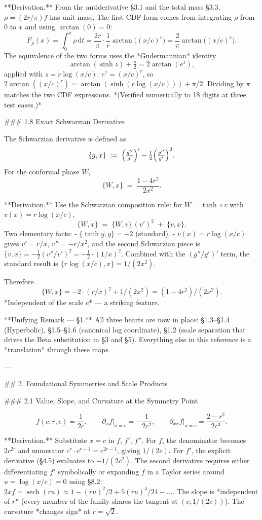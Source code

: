 **Derivation.** From the antiderivative §3.1 and the total mass §3.3, $\rho = (2r/\pi)f$ has unit mass. The first CDF form comes from integrating $\rho$ from 0 to $x$ and using $\arctan(0)=0$:
$$
F_{\rho}(x) = \int_{0}^{x}\rho\,\mathrm dt = \frac{2r}{\pi}\cdot\frac{1}{r}\arctan\!\bigl((x/c)^{r}\bigr) = \frac{2}{\pi}\arctan\!\bigl((x/c)^{r}\bigr).
$$
The equivalence of the two forms uses the *Gudermannian* identity
$$
\arctan(\sinh z) + \tfrac{\pi}{2} = 2\arctan(e^{z}),
$$
applied with $z = r\log(x/c)$: $e^{z} = (x/c)^{r}$, so $2\arctan((x/c)^{r}) = \arctan(\sinh(r\log(x/c))) + \pi/2$. Dividing by $\pi$ matches the two CDF expressions. *(Verified numerically to 18 digits at three test cases.)*

### 1.8 Exact Schwarzian Derivative

The Schwarzian derivative is defined as
$$
\{g,x\}\;:=\;\Bigl(\tfrac{g''}{g'}\Bigr)' - \tfrac{1}{2}\Bigl(\tfrac{g''}{g'}\Bigr)^{2}.
$$
For the conformal phase $W$,
$$
\boxed{\;\{W,x\}\;=\;\frac{1-4r^{2}}{2x^{2}}.\;}
$$

**Derivation.** Use the Schwarzian composition rule: for $W = \tanh\circ v$ with $v(x) = r\log(x/c)$,
$$
\{W,x\} \;=\; \{W,v\}\,(v')^{2} \;+\; \{v,x\}.
$$
Two elementary facts:
- $\{\tanh y, y\} = -2$ (standard).
- $v(x) = r\log(x/c)$ gives $v' = r/x$, $v'' = -r/x^{2}$, and the second Schwarzian piece is $\{v,x\} = -\tfrac{1}{2}(v''/v')^{2} = -\tfrac{1}{2}\cdot(1/x)^{2}$. Combined with the $(g''/g')'$ term, the standard result is $\{r\log(x/c),x\} = 1/(2x^{2})$.

Therefore
$$
\{W,x\} = -2\cdot(r/x)^{2} + 1/(2x^{2}) = (1-4r^{2})/(2x^{2}).
$$
*Independent of the scale $c$* — a striking feature.

**Unifying Remark — §1.** All three hearts are now in place: §1.3–§1.4 (Hyperbolic), §1.5–§1.6 (canonical log coordinate), §1.2 (scale separation that drives the Beta substitution in §3 and §5). Everything else in this reference is a *translation* through these maps.

---

## 2. Foundational Symmetries and Scale Products

### 2.1 Value, Slope, and Curvature at the Symmetry Point

$$
f(c;r,c)=\frac{1}{2c},\qquad \partial_{x}f\big|_{x=c}=-\frac{1}{2c^{2}},\qquad \partial_{xx}f\big|_{x=c}=\frac{2-r^{2}}{2c^{3}}.
$$

**Derivation.** Substitute $x = c$ in $f$, $f'$, $f''$. For $f$, the denominator becomes $2c^{2r}$ and numerator $c^{r}\cdot c^{r-1}=c^{2r-1}$, giving $1/(2c)$. For $f'$, the explicit derivative (§4.5) evaluates to $-1/(2c^{2})$. The second derivative requires either differentiating $f'$ symbolically or expanding $f$ in a Taylor series around $u=\log(x/c)=0$ using §8.2: $2xf = \operatorname{sech}(ru) \approx 1 - (ru)^2/2 + 5(ru)^4/24-\ldots$. The slope is *independent of $r$* (every member of the family shares the tangent at $(c,1/(2c))$). The curvature *changes sign* at $r=\sqrt 2$.

